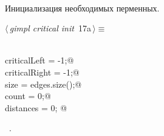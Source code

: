 \documentclass[12pt]{article}
\begin{document}
\paragraph{}
Инициализация необходимых перменных.
\begin{flushleft} \small
\begin{minipage}{\linewidth}\label{scrap32}\raggedright\small
{} $\langle\,${\itshape gimpl critical init}\nobreak\ {\footnotesize {17a}}$\,\rangle\equiv$
\vspace{-1ex}
\begin{list}{}{} \item
\mbox{}\verb@@\\
\mbox{}\verb@int criticalLeft = -1;@\\
\mbox{}\verb@int criticalRight = -1;@\\
\mbox{}\verb@int size = edges.size();@\\
\mbox{}\verb@int count = 0;@\\
\mbox{}\verb@double distances = 0; @\\
\mbox{}\verb@@{\NWsep}
\end{list}
\vspace{-1.5ex}
\footnotesize
\begin{list}{}{\setlength{\itemsep}{-\parsep}\setlength{\itemindent}{-\leftmargin}}
\item \NWtxtMacroRefIn\ .

\item{}
\end{list}
\end{minipage}\vspace{4ex}
\end{flushleft}
\end{document}
